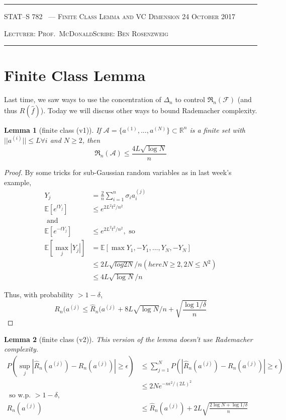 \documentclass[10pt]{article}
\newcounter{lecnum}
\newtheorem{lemma}[lemma]{Lemma}
\renewcommand{\hat}{\widehat}
\newcommand{\F}{\mathcal{F}}
\newcommand{\E}[1]{\mathbb{E}\!\left[#1\right]}
\newcommand{\R}{\mathbb{R}}
\newcommand{\rad}{\ensuremath{\mathfrak{R}}}
\renewcommand{\F}{\ensuremath{\mathcal{F}}}
\newcommand{\rhat}{\ensuremath{\hat{R}}}
\newcommand{\lecturer}{Prof.\ McDonald}
\newcommand{\scribe}{Ben Rosenzweig}
\newcommand{\chtitle}{Finite Class Lemma and VC Dimension}
\newcommand{\lecdate}{24 October 2017}
\begin{document}
\rule{6.5in}{1pt}

\textsc{STAT--S 782
        \hfill \thelecnum\ --- \chtitle
        \hfill \lecdate}

\textsc{Lecturer: \lecturer \hfill Scribe: \scribe}
\rule{6.5in}{1pt}

\section{Finite Class Lemma}
Last time, we saw ways to use the concentration of $\Delta_n$ to control $\rad_n(\F)$ (and thus $R(\hat{f})$).
  Today we will discuss other ways to bound Rademacher complexity.

  \begin{lemma}[finite class (v1)]
    If $\mathcal{A}=\{a^{(1)},...,a^{(N)}\}\subset\R^n$ is a finite set with $||a^{(i)}||\leq L \forall i$ and $N\geq2$, then
    \[
    \rad_n(\mathcal{A})\leq \frac{4L\sqrt{\log{N}}}{n}
   \]
  \end{lemma}
  
  \begin{proof}
    By some tricks for sub-Gaussian random variables as in last week's example,
    \begin{align}
      Y_j &= \frac{2}{n} \sum_{i=1}^n \sigma_ia_i^{(j)}\\
    \E{e^{tY_j}} &\leq e^{2L^2t^2/n^2}\\
      \text{ and }\\
        \E{e^{-tY_j}} &\leq e^{2L^2t^2/n^2},\text{  so }\\
   \E{\max_j|Y_j|} &= \E{\max{Y_1,-Y_1,...,Y_N,-Y_N}}\\
    &\leq 2L\sqrt{log2N}/n  (here N\geq2, 2N\leq N^2)\\
    &\leq 4L\sqrt{\log N}/n
    \end{align}

    Thus, with probability $>1-\delta$,
    \[
    R_n(a^{(j)}\leq \rhat_n(a^{(j)}+8L\sqrt{\log N}/n+\sqrt{\frac{\log 1/\delta}{n}}
   \]
  \end{proof}


  \begin{lemma}[finite class (v2)]
      This version of the lemma doesn't use Rademacher complexity.
  \begin{align}
    P(\sup_j|\rhat_n(a^{(j)}) - R_n(a^{(j)})|\geq\epsilon)
  &\leq \sum_{j=1}^N P(|\rhat_n(a^{(j)})-R_n(a^{(j)})|\geq\epsilon)\\
   &\leq 2Ne^{-n\epsilon^2/(2L)^2}\\
  \text{ so w.p. }>1-\delta,\\
  R_n(a^{(j)})&\leq \rhat_n(a^{(j)})+2L\sqrt{\frac{2\log N + \log 1/\delta}{n}}
\end{align}
  \end{lemma}
\end{document}
